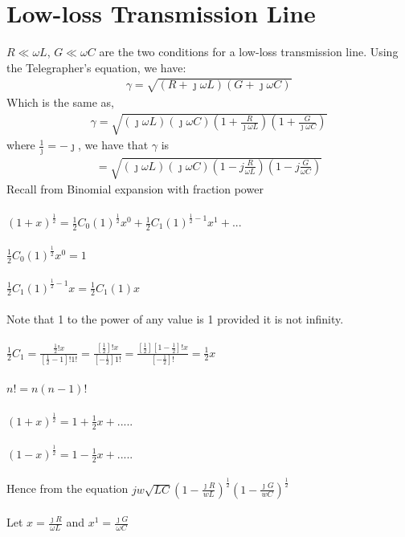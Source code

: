 \section{Low-loss Transmission Line}
$R \ll \omega L$, $G \ll \omega C$ are the two conditions for a low-loss transmission line. Using the Telegrapher's equation, we have:
\begin{align*}
\gamma = \sqrt{(R + \jmath\omega L)(G + \jmath\omega C)}
\end{align*}
Which is the same as,
\begin{align*}
\gamma = \sqrt{{(\jmath\omega L)(\jmath\omega C)(1 + \frac{R}{\jmath\omega L})(1 + \frac{G}{\jmath\omega C})}}
\end{align*}
where $\frac{1}{\jmath} = -\jmath$, we have that $\gamma$ is
\begin{align*}
= \sqrt{{(\jmath\omega L)(\jmath\omega C)(1 - j\frac{R}{\omega L})(1 - j\frac{G}{\omega C})}}
\end{align*}
Recall from Binomial expansion with fraction power\\\\
$(1 + x)^{\frac{1}{2}} = \frac{1}{2}C_0(1)^{\frac{1}{2}}x^0 + \frac{1}{2}C_1(1)^{{\frac{1}{2}} - 1}x^1 + ...$\\\\
$\frac{1}{2}C_0(1)^{\frac{1}{2}}x^0 = 1$\\\\
$\frac{1}{2}C_1(1)^{\frac{1}{2} - 1}x = \frac{1}{2}C_1(1)x$\\\\
Note that 1 to the power of any value is 1 provided it is not infinity.\\\\
$\frac{1}{2}C_1 = \frac{\frac{1}{2}! x}{[\frac{1}{2} - 1]! 1!} = \frac{[\frac{1}{2}]!x}{[-\frac{1}{2}]1!} = \frac{[\frac{1}{2}][1 - \frac{1}{2}]!x}{[-\frac{1}{2}]!} = \frac{1}{2}x$\\\\
$n! = n(n - 1)!$\\\\
$(1 + x)^{\frac{1}{2}} = 1 + \frac{1}{2}x + .....$\\\\
$(1 - x)^{\frac{1}{2}} = 1 - \frac{1}{2}x + .....$\\\\
Hence from the equation
$jw\sqrt{LC}(1 - \frac{\jmath R}{wL})^{\frac{1}{2}}(1 - \frac{\jmath G}{wC})^{\frac{1}{2}}$\\\\
Let $x = \frac{\jmath R}{\omega L}$ and $x^1 = \frac{\jmath G}{\omega C}$\\\\
